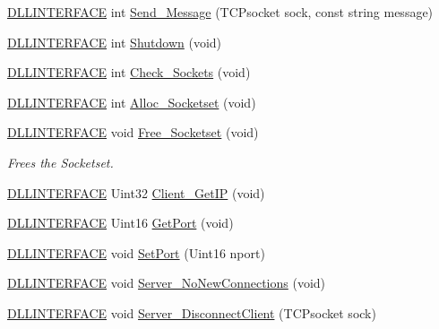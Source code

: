 \begin{DoxyCompactItemize}
\item 
\hyperlink{_s_d_l__ep_8h_a38dd54df4631b4daf553096353d7b20b}{D\-L\-L\-I\-N\-T\-E\-R\-F\-A\-C\-E} int \hyperlink{classc_t_c_p_net_a6a7a00f0ac2b3c780d7acd2216574ef9}{Send\-\_\-\-Message} (T\-C\-Psocket sock, const string message)
\item 
\hyperlink{_s_d_l__ep_8h_a38dd54df4631b4daf553096353d7b20b}{D\-L\-L\-I\-N\-T\-E\-R\-F\-A\-C\-E} int \hyperlink{classc_t_c_p_net_a227063acbfe3f006c8519786e7a41fab}{Shutdown} (void)
\item 
\hyperlink{_s_d_l__ep_8h_a38dd54df4631b4daf553096353d7b20b}{D\-L\-L\-I\-N\-T\-E\-R\-F\-A\-C\-E} int \hyperlink{classc_t_c_p_net_af8b79d5d7d696ee8d77d76e896e9d619}{Check\-\_\-\-Sockets} (void)
\item 
\hyperlink{_s_d_l__ep_8h_a38dd54df4631b4daf553096353d7b20b}{D\-L\-L\-I\-N\-T\-E\-R\-F\-A\-C\-E} int \hyperlink{classc_t_c_p_net_a66e58d6a4c7a67d6e501384e73b99a42}{Alloc\-\_\-\-Socketset} (void)
\item 
\hyperlink{_s_d_l__ep_8h_a38dd54df4631b4daf553096353d7b20b}{D\-L\-L\-I\-N\-T\-E\-R\-F\-A\-C\-E} void \hyperlink{classc_t_c_p_net_a8940d4bdd34ad6d2110e6d098de699fc}{Free\-\_\-\-Socketset} (void)
\begin{DoxyCompactList}\small\item\em Frees the Socketset. \end{DoxyCompactList}\item 
\hyperlink{_s_d_l__ep_8h_a38dd54df4631b4daf553096353d7b20b}{D\-L\-L\-I\-N\-T\-E\-R\-F\-A\-C\-E} Uint32 \hyperlink{classc_t_c_p_net_a402c0621d960563560468e103f93ddd9}{Client\-\_\-\-Get\-I\-P} (void)
\item 
\hyperlink{_s_d_l__ep_8h_a38dd54df4631b4daf553096353d7b20b}{D\-L\-L\-I\-N\-T\-E\-R\-F\-A\-C\-E} Uint16 \hyperlink{classc_t_c_p_net_a2622c8280cbf687dc5ebca391540038b}{Get\-Port} (void)
\item 
\hyperlink{_s_d_l__ep_8h_a38dd54df4631b4daf553096353d7b20b}{D\-L\-L\-I\-N\-T\-E\-R\-F\-A\-C\-E} void \hyperlink{classc_t_c_p_net_acf77c196ccbd24d28e4d954c56e1a607}{Set\-Port} (Uint16 nport)
\item 
\hyperlink{_s_d_l__ep_8h_a38dd54df4631b4daf553096353d7b20b}{D\-L\-L\-I\-N\-T\-E\-R\-F\-A\-C\-E} void \hyperlink{classc_t_c_p_net_a05f97c01839e4dd0b896c090fea7d8f1}{Server\-\_\-\-No\-New\-Connections} (void)
\item 
\hyperlink{_s_d_l__ep_8h_a38dd54df4631b4daf553096353d7b20b}{D\-L\-L\-I\-N\-T\-E\-R\-F\-A\-C\-E} void \hyperlink{classc_t_c_p_net_a2afbf5d90c709a6f1192e27779862249}{Server\-\_\-\-Disconnect\-Client} (T\-C\-Psocket sock)

\end{DoxyCompactItemize}
